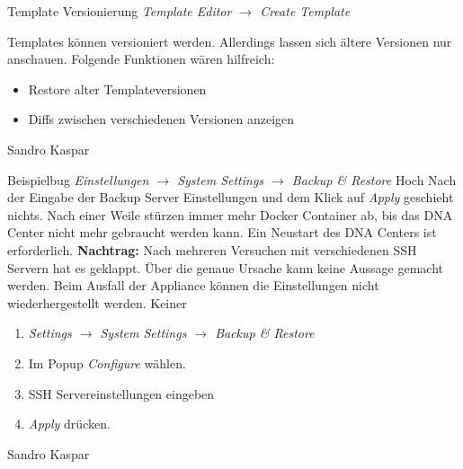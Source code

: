 \featureRequest
{Template Versionierung}
{\textit{Template Editor $\rightarrow$ Create Template}}
{Templates können versioniert werden. Allerdings lassen sich ältere Versionen nur anschauen. Folgende Funktionen wären hilfreich:
\begin{itemize}
	\item Restore alter Templateversionen
	\item Diffs zwischen verschiedenen Versionen anzeigen
\end{itemize}
}
{Sandro Kaspar}
{}

\bugreport
{Beispielbug}
{\textit{Einstellungen $\rightarrow$ System Settings $\rightarrow$ Backup \& Restore}}
{Hoch}
{Nach der Eingabe der Backup Server Einstellungen und dem Klick auf \textit{Apply} geschieht nichts. Nach einer Weile stürzen immer mehr Docker Container ab, bis das DNA Center nicht mehr gebraucht werden kann. Ein Neustart des DNA Centers ist erforderlich.
\textbf{Nachtrag:} Nach mehreren Versuchen mit verschiedenen SSH Servern hat es geklappt. Über die genaue Ursache kann keine Aussage gemacht werden.
}
{Beim Ausfall der Appliance können die Einstellungen nicht wiederhergestellt werden.}
{Keiner}
{
	\begin{enumerate}
		\item \textit{Settings $\rightarrow$ System Settings $\rightarrow$ Backup \& Restore}
		\item Im Popup \textit{Configure} wählen. 
		\item SSH Servereinstellungen eingeben
		\item \textit{Apply} drücken. 
	\end{enumerate}
}
{Sandro Kaspar}
{}

